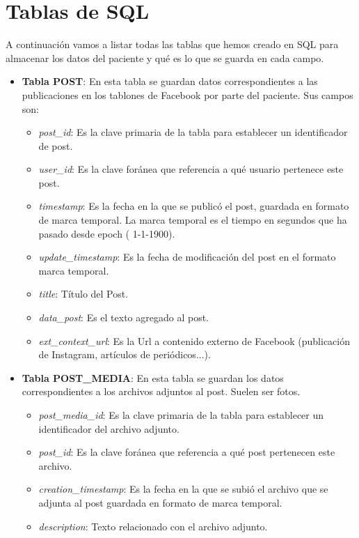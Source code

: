 \chapter{Tablas de SQL}
\label{Appendix:Key1}

A continuación vamos a listar todas las tablas que hemos creado en SQL para almacenar los datos del paciente y qué es lo que se guarda en cada campo.

\begin{itemize}
	\item \textbf{ Tabla POST}: En esta tabla se guardan datos correspondientes a las publicaciones en los tablones de Facebook por parte del paciente. Sus campos son:
	\begin{itemize}
		\item \textit{ post\_id}: Es la clave primaria de la tabla para establecer un identificador de post.
		\item \textit{ user\_id}: Es la clave foránea que referencia a qué usuario pertenece este post.
		\item \textit{ timestamp}: Es la fecha en la que se publicó el post, guardada en formato de marca temporal. La marca temporal es el tiempo en segundos que ha pasado desde epoch ( 1-1-1900).
		\item \textit{ update\_timestamp}: Es la fecha de modificación del post en el formato marca temporal.
		\item \textit{ title}: Título del Post.
		\item \textit{ data\_post}: Es el texto agregado al post.
		\item \textit{ ext\_context\_url}: Es la Url a contenido externo de Facebook (publicación de Instagram, artículos de periódicos...).
	\end{itemize}
	\item \textbf{ Tabla POST\_MEDIA}: En esta tabla se guardan los datos correspondientes a los archivos adjuntos al post. Suelen ser fotos.
	\begin{itemize}
		\item \textit{ post\_media\_id}: Es la clave primaria de la tabla para establecer un identificador del archivo adjunto.
		\item \textit{ post\_id}: Es la clave foránea que referencia a qué post pertenecen este archivo.
		\item \textit{ creation\_timestamp}: Es la fecha en la que se subió el archivo que se adjunta al post guardada en formato de marca temporal.
		\item \textit{ description}: Texto relacionado con el archivo adjunto.

\end{itemize}
\end{itemize}
